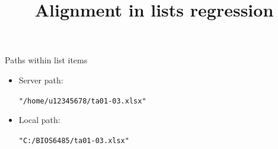 \documentclass[14pt,t]{beamer-accessibility}
\title{Alignment in lists regression}
\begin{document}
\begin{frame}{Paths within list items}
\begin{itemize}
\item Server path:
\begin{center}\texttt{"/home/u12345678/ta01-03.xlsx"}\end{center}
\item Local path:
\begin{center}\texttt{"C:/BIOS6485/ta01-03.xlsx"}\end{center}
\end{itemize}
\end{frame}
\end{document}
